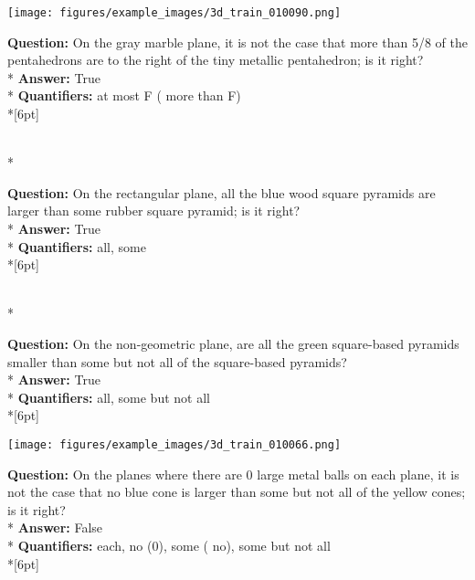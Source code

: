 \begin{figure*}  
\begin{minipage}{0.48\textwidth}
    \texttt{[image: figures/example\_images/3d\_train\_010090.png]}
    \begin{minipage}[t][2.2cm][t]{1\textwidth}
      \footnotesize
      \textbf{Question:} On the gray marble plane, it is not the case that more than 5/8 of the pentahedrons are to the right of the tiny metallic pentahedron; is it right? \\*
      \textbf{Answer:}  True \\*
      \textbf{Quantifiers:}  at most F ( more than F) \\*[6pt]
    \end{minipage}\\*
    \begin{minipage}[t][2.2cm][t]{1\textwidth}
      \footnotesize
      \textbf{Question:} On the rectangular plane, all the blue wood square pyramids are larger than some rubber square pyramid; is it right? \\*
      \textbf{Answer:} True \\*
      \textbf{Quantifiers:}  all, some \\*[6pt]
    \end{minipage}\\*
    \begin{minipage}[t][2.2cm][t]{1\textwidth}
      \footnotesize
      \textbf{Question:} On the non-geometric plane, are all the green square-based pyramids smaller than some but not all of the square-based pyramids? \\*
      \textbf{Answer:} True \\*
      \textbf{Quantifiers:} all, some but not all \\*[6pt]
    \end{minipage}
  \end{minipage}
  \hspace{3.5mm}
  \begin{minipage}{0.48\textwidth}
    \texttt{[image: figures/example\_images/3d\_train\_010066.png]}
    \begin{minipage}[t][2.2cm][t]{1\textwidth}
      \footnotesize
      \textbf{Question:}  On the planes where there are 0 large metal balls on each plane, it is not the case that no blue cone is larger than some but not all of the yellow cones; is it right? \\*
      \textbf{Answer:} False \\*
      \textbf{Quantifiers:} each, no (0), some ( no), some but not all \\*[6pt]

\end{minipage}
\end{minipage}
\end{figure*}
